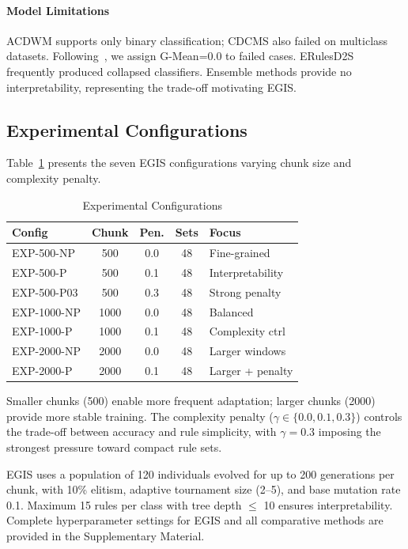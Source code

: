 \documentclass[lettersize,journal]{IEEEtran}
\begin{document}
\paragraph{Model Limitations} ACDWM supports only binary classification; CDCMS also failed on multiclass datasets. Following~\cite{demsar2006statistical}, we assign G-Mean=0.0 to failed cases. ERulesD2S frequently produced collapsed classifiers. Ensemble methods provide no interpretability, representing the trade-off motivating EGIS.


\subsection{Experimental Configurations}

Table~\ref{tab:exp_config} presents the seven EGIS configurations varying chunk size and complexity penalty.

\begin{table}[htbp]
\centering
\caption{Experimental Configurations}
\label{tab:exp_config}
\footnotesize
\begin{tabular}{lcccl}
\toprule
\textbf{Config} & \textbf{Chunk} & \textbf{Pen.} & \textbf{Sets} & \textbf{Focus} \\
\midrule
EXP-500-NP & 500 & 0.0 & 48 & Fine-grained \\
EXP-500-P & 500 & 0.1 & 48 & Interpretability \\
EXP-500-P03 & 500 & 0.3 & 48 & Strong penalty \\
EXP-1000-NP & 1000 & 0.0 & 48 & Balanced \\
EXP-1000-P & 1000 & 0.1 & 48 & Complexity ctrl \\
EXP-2000-NP & 2000 & 0.0 & 48 & Larger windows \\
EXP-2000-P & 2000 & 0.1 & 48 & Larger + penalty \\
\bottomrule
\end{tabular}
\end{table}

Smaller chunks (500) enable more frequent adaptation; larger chunks (2000) provide more stable training. The complexity penalty ($\gamma \in \{0.0, 0.1, 0.3\}$) controls the trade-off between accuracy and rule simplicity, with $\gamma = 0.3$ imposing the strongest pressure toward compact rule sets.

EGIS uses a population of 120 individuals evolved for up to 200 generations per chunk, with 10\% elitism, adaptive tournament size (2--5), and base mutation rate 0.1. Maximum 15 rules per class with tree depth $\leq$ 10 ensures interpretability. Complete hyperparameter settings for EGIS and all comparative methods are provided in the Supplementary Material.
\end{document}
